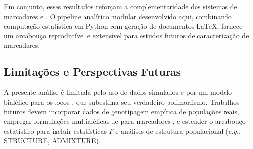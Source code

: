 Em conjunto, esses resultados reforçam a complementaridade dos sistemas de
marcadores \snp{} e \ssr{}. O pipeline analítico modular desenvolvido aqui,
combinando computação estatística em Python com geração de documentos
\LaTeX{}, fornece um arcabouço reprodutível e extensível para estudos
futuros de caracterização de marcadores.

\subsection{Limitações e Perspectivas Futuras}

A presente análise é limitada pelo uso de dados simulados e por um modelo
bialélico para os locos \ssr{}, que subestima seu verdadeiro polimorfismo.
Trabalhos futuros devem incorporar dados de genotipagem empírica de
populações reais, empregar formulações multialélicas de \pic{} para
marcadores \ssr{} \autocite{Anderson1993}, e estender o arcabouço
estatístico para incluir estatísticas $F$ e análises de estrutura
populacional (\textit{e.g.}, STRUCTURE, ADMIXTURE).
